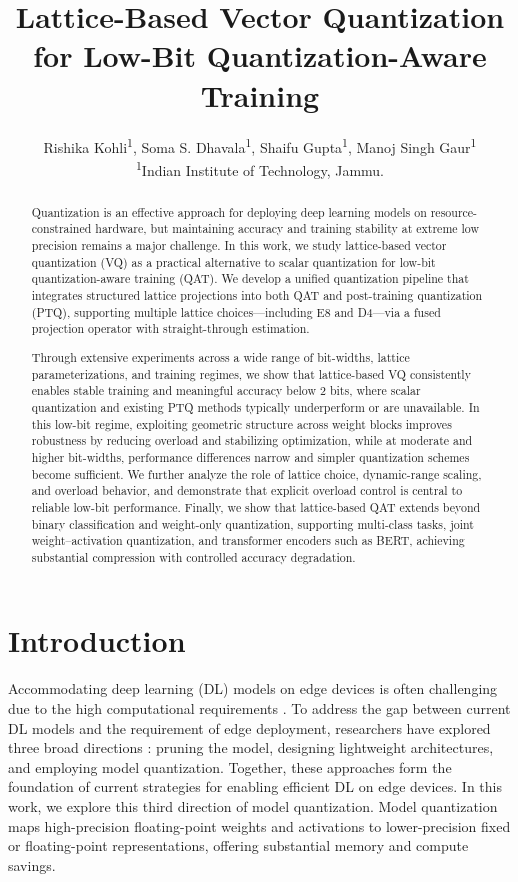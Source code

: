 \documentclass{article}
\title{Lattice-Based Vector Quantization for Low-Bit Quantization-Aware Training}
\author{%
  Rishika Kohli\textsuperscript{1}, 
  Soma S. Dhavala\textsuperscript{1},
  Shaifu Gupta\textsuperscript{1}, 
  Manoj Singh Gaur\textsuperscript{1}
  \\
  \textsuperscript{1}Indian Institute of Technology, Jammu. %
}
\theoremstyle{definition}
\theoremstyle{remark}
\begin{document}
\maketitle

\begin{abstract}
Quantization is an effective approach for deploying deep learning models on resource-constrained hardware, but maintaining accuracy and training stability at extreme low precision remains a major challenge. In this work, we study lattice-based vector quantization (VQ) as a practical alternative to scalar quantization for low-bit quantization-aware training (QAT). We develop a unified quantization pipeline that integrates structured lattice projections into both QAT and post-training quantization (PTQ), supporting multiple lattice choices—including E8 and D4—via a fused projection operator with straight-through estimation.

Through extensive experiments across a wide range of bit-widths, lattice parameterizations, and training regimes, we show that lattice-based VQ consistently enables stable training and meaningful accuracy below 2 bits, where scalar quantization and existing PTQ methods typically underperform or are unavailable. In this low-bit regime, exploiting geometric structure across weight blocks improves robustness by reducing overload and stabilizing optimization, while at moderate and higher bit-widths, performance differences narrow and simpler quantization schemes become sufficient. We further analyze the role of lattice choice, dynamic-range scaling, and overload behavior, and demonstrate that explicit overload control is central to reliable low-bit performance. Finally, we show that lattice-based QAT extends beyond binary classification and weight-only quantization, supporting multi-class tasks, joint weight–activation quantization, and transformer encoders such as BERT, achieving substantial compression with controlled accuracy degradation.
\end{abstract}

\section{Introduction}
Accommodating deep learning (DL) models on edge devices is often challenging due to the high computational requirements \cite{nguyen2024bold}. To address the gap between current DL models and the requirement of edge deployment, researchers have explored three broad directions \cite{diao2024attention}: pruning the model, designing lightweight architectures, and employing model quantization. Together, these approaches form the foundation of current strategies for enabling efficient DL on edge devices. In this work, we explore this third direction of model quantization. Model quantization maps high-precision floating-point weights and activations to lower-precision fixed or floating-point representations, offering substantial memory and compute savings. 
\end{document}
